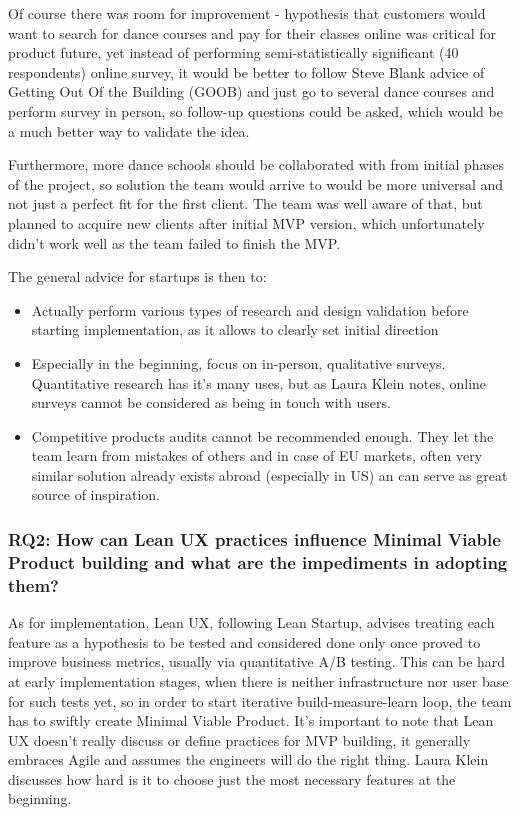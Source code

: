 \documentclass{article}
\begin{document}
Of course there was room for improvement - hypothesis that customers would want to search for dance courses and pay for their classes online was critical for product future, yet instead of performing semi-statistically significant (40 respondents) online survey, it would be better to follow Steve Blank \citep{blank2013four} advice of Getting Out Of the Building (GOOB) and just go to several dance courses and perform survey in person, so follow-up questions could be asked, which would be a much better way to validate the idea.

Furthermore, more dance schools should be collaborated with from initial phases of the project, so solution the team would arrive to would be more universal and not just a perfect fit for the first client. The team was well aware of that, but planned to acquire new clients after initial MVP version, which unfortunately didn't work well as the team failed to finish the MVP.

The general advice for startups is then to:
\begin{itemize}
\item Actually perform various types of research and design validation before starting implementation, as it allows to clearly set initial direction
\item Especially in the beginning, focus on in-person, qualitative surveys. Quantitative research has it's many uses, but as Laura Klein \citep{klein2013ux} notes, online surveys cannot be considered as being in touch with users.
\item Competitive products audits cannot be recommended enough. They let the team learn from mistakes of others and in case of EU markets, often very similar solution already exists abroad (especially in US) an can serve as great source of inspiration.
\end{itemize}

\subsubsection{RQ2: How can Lean UX practices influence Minimal Viable Product building and what are the impediments in adopting them?}
As for implementation, Lean UX, following Lean Startup, advises treating each feature as a hypothesis to be tested and considered done only once proved to improve business metrics, usually via quantitative A/B testing. This can be hard at early implementation stages, when there is neither infrastructure nor user base for such tests yet, so in order to start iterative build-measure-learn loop, the team has to swiftly create Minimal Viable Product. It's important to note that Lean UX doesn't really discuss or define practices for MVP building, it generally embraces Agile and assumes the engineers will do the right thing. Laura Klein \citep{klein2013ux} discusses how hard is it to choose just the most necessary features at the beginning.
\end{document}
